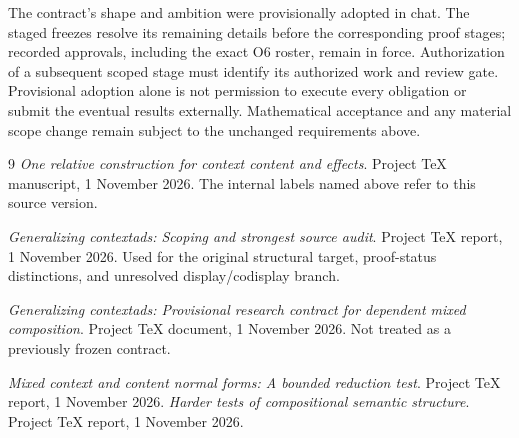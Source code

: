 \documentclass[11pt,a4paper]{article}
\begin{document}
The contract's shape and ambition were provisionally adopted in chat.
The staged freezes resolve its remaining details before the corresponding
proof stages; recorded approvals, including the exact O6 roster, remain in
force. Authorization of a subsequent scoped stage must identify its
authorized work and review gate. Provisional adoption alone is not permission
to execute every obligation or submit the eventual results externally.
Mathematical acceptance and any material scope change remain subject to the
unchanged requirements above.

\begin{thebibliography}{9}
\emph{One relative construction for context content and effects}.
Project TeX manuscript, 1 November 2026.
The internal labels named above refer to this source version.

\emph{Generalizing contextads: Scoping and strongest source audit}.
Project TeX report, 1 November 2026.
Used for the original structural target, proof-status distinctions, and
unresolved display/codisplay branch.

\emph{Generalizing contextads: Provisional research contract for dependent
mixed composition}.
Project TeX document, 1 November 2026.
Not treated as a previously frozen contract.

\emph{Mixed context and content normal forms: A bounded reduction test}.
Project TeX report, 1 November 2026.
\emph{Harder tests of compositional semantic structure}.
Project TeX report, 1 November 2026.
\end{thebibliography}
\end{document}
